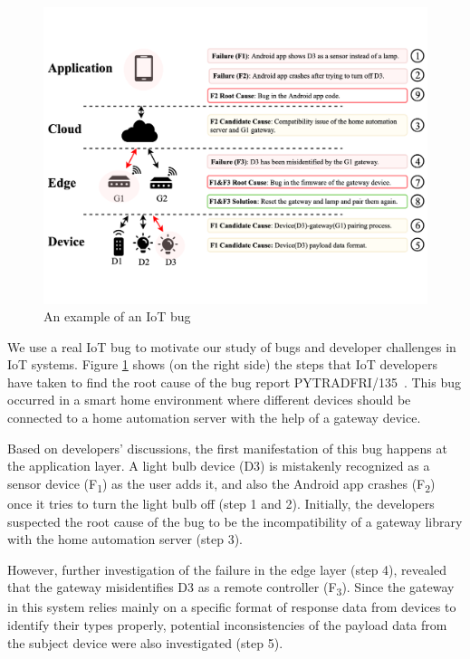  \begin{figure}[t]
  \centering 
   \includegraphics[width=\linewidth]{./imgs/motiv.pdf}
  \caption{An example of an IoT bug}
  \label{fig:arch}
\end{figure}


We use a real IoT bug to motivate our study of bugs and developer challenges in IoT systems. 
Figure \ref{fig:arch} shows (on the right side) the steps that IoT developers have taken to find the root cause of the bug report PYTRADFRI/135~\cite{iotbug:290}. This bug occurred in a smart home environment where different devices should be connected to a home automation server with the help of a gateway device.


Based on developers' discussions, the first manifestation of this bug happens at the application layer. A light bulb device (D3) is mistakenly recognized as a sensor device (F\textsubscript{1}) as the user adds it, and also the Android app crashes (F\textsubscript{2}) once it tries to turn the light bulb off (step 1 and 2). Initially, the developers suspected the root cause of the bug to be the incompatibility of a gateway library with the home automation server (step 3).


However, further investigation of the failure in the edge layer (step 4), revealed that the gateway misidentifies D3 as a remote controller (F\textsubscript{3}). Since the gateway in this system relies mainly on a specific format of response data from devices to identify their types properly, potential inconsistencies of the payload data from the subject device were also investigated (step 5). 


